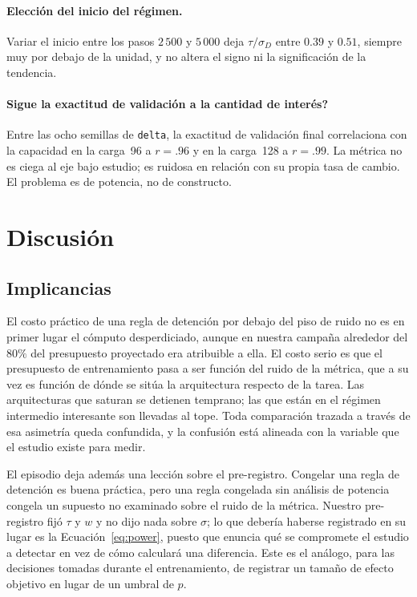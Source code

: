 \documentclass[jou,11pt,donotrepeattitle]{apa7}
\begin{document}
\paragraph{Elecci\'on del inicio del r\'egimen.} Variar el inicio entre los pasos $2\,500$ y
$5\,000$ deja $\tau/\sigma_D$ entre $0.39$ y $0.51$, siempre muy por debajo de la unidad, y no
altera el signo ni la significaci\'on de la tendencia.

\paragraph{\textquestiondown Sigue la exactitud de validaci\'on a la cantidad de inter\'es?} Entre las ocho
semillas de \texttt{delta}, la exactitud de validaci\'on final correlaciona con la capacidad en
la carga~96 a $r = .96$ y en la carga~128 a $r = .99$. La m\'etrica no es ciega al eje bajo
estudio; es ruidosa en relaci\'on con su propia tasa de cambio. El problema es de potencia, no de
constructo.

\section{Discusi\'on}

\subsection{Implicancias}

El costo pr\'actico de una regla de detenci\'on por debajo del piso de ruido no es en primer
lugar el c\'omputo desperdiciado, aunque en nuestra campa\~na alrededor del $80\%$ del
presupuesto proyectado era atribuible a ella. El costo serio es que el presupuesto de
entrenamiento pasa a ser funci\'on del ruido de la m\'etrica, que a su vez es funci\'on de d\'onde
se sit\'ua la arquitectura respecto de la tarea. Las arquitecturas que saturan se detienen
temprano; las que est\'an en el r\'egimen intermedio interesante son llevadas al tope. Toda
comparaci\'on trazada a trav\'es de esa asimetr\'ia queda confundida, y la confusi\'on est\'a
alineada con la variable que el estudio existe para medir.

El episodio deja adem\'as una lecci\'on sobre el pre-registro. Congelar una regla de detenci\'on
es buena pr\'actica, pero una regla congelada sin an\'alisis de potencia congela un supuesto no
examinado sobre el ruido de la m\'etrica. Nuestro pre-registro fij\'o $\tau$ y $w$ y no dijo nada
sobre $\sigma$; lo que deber\'ia haberse registrado en su lugar es la Ecuaci\'on~\ref{eq:power},
puesto que enuncia qu\'e se compromete el estudio a detectar en vez de c\'omo calcular\'a una
diferencia. Este es el an\'alogo, para las decisiones tomadas durante el entrenamiento, de
registrar un tama\~no de efecto objetivo en lugar de un umbral de $p$.
\end{document}
